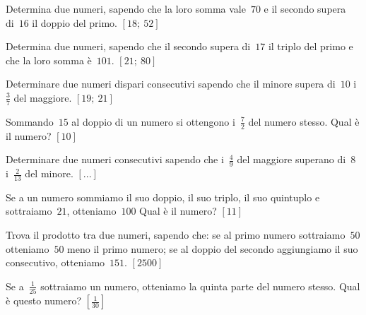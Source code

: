 \begin{htmulticols}{2}

\begin{esercizio}[*]
\label{ese:14.1}
Determina due numeri, sapendo che la loro somma vale~\(70\) e il secondo supera 
di~\(16\) il doppio del primo. \hfill \(\left[18;~52\right]\)
\end{esercizio}

\begin{esercizio}[*]
\label{ese:14.2}
Determina due numeri, sapendo che il secondo supera di~\(17\) il triplo del primo 
e che la loro somma è~\(101\). \hfill \(\left[21;~80\right]\)
\end{esercizio}

\begin{esercizio}[*]
\label{ese:14.3}
Determinare due numeri dispari consecutivi sapendo che il minore supera di~\(10\) 
i~\(\frac{3}{7}\) del maggiore. \hfill \(\left[19;~21\right]\)
\end{esercizio}

\begin{esercizio}[*]
\label{ese:14.4}
Sommando~\(15\) al doppio di un numero si ottengono i~\(\frac{7}{2}\) del numero 
stesso. Qual è il numero? \hfill \(\left[10\right]\)
\end{esercizio}

\begin{esercizio}
\label{ese:14.5}
Determinare due numeri consecutivi sapendo che i~\(\frac{4}{9}\) del maggiore 
superano di~\(8\) i~\(\frac{2}{13}\) del minore. \hfill \(\left[...\right]\)
\end{esercizio}

\begin{esercizio}[*]
\label{ese:14.6}
Se a un numero sommiamo il suo doppio, il suo triplo, il suo quintuplo e 
sottraiamo~\(21\), otteniamo~\(100\) Qual è il numero? \hfill 
\(\left[11\right]\)
\end{esercizio}

\begin{esercizio}[*]
\label{ese:14.7}
Trova il prodotto tra due numeri, sapendo che: se al primo numero 
sottraiamo~\(50\) otteniamo~\(50\) meno il primo numero; se al doppio del 
secondo 
aggiungiamo il suo consecutivo, otteniamo~\(151\). \hfill \(\left[2500\right]\)
\end{esercizio}

\begin{esercizio}[*]
\label{ese:14.8}
Se a~\(\frac{1}{25}\) sottraiamo un numero, otteniamo la quinta parte del 
numero 
stesso. Qual è questo numero? \hfill \(\left[\frac{1}{30}\right]\)
\end{esercizio}


\end{htmulticols}
